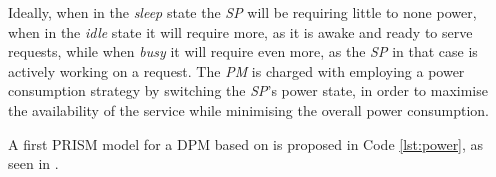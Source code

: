   Ideally, when in the \textit{sleep} state the \textit{SP} will be requiring little to none power, when in the \textit{idle} state it will require more, as it is awake and ready to serve requests, while when \textit{busy} it will require even more, as the \textit{SP} in that case is actively working on a request. The \textit{PM} is charged with employing a power consumption strategy by switching the \textit{SP}'s power state, in order to maximise the availability of the service while minimising the overall power consumption.
  
  A first PRISM model for a DPM based on \cite{qiu2001stochastic} is proposed in Code \ref{lst:power}, as seen in \cite{prism-tutorial3}.
  
  \begin{center}
    
  \end{center}
  
  
